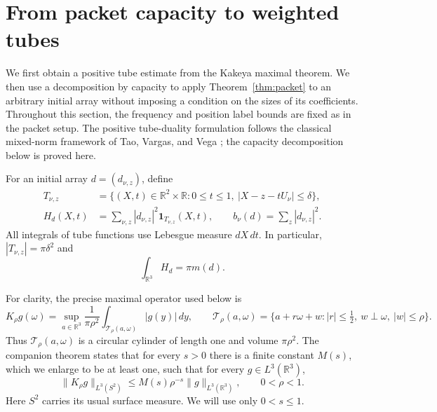 \section{From packet capacity to weighted tubes}\label{sec:density}

We first obtain a positive tube estimate from the Kakeya maximal theorem.
We then use a decomposition by capacity to apply Theorem~\ref{thm:packet}
to an arbitrary initial array without imposing a condition on the sizes
of its coefficients. Throughout this section, the frequency and position
label bounds are fixed as in the packet setup. The positive
tube-duality formulation follows the classical mixed-norm framework
of Tao, Vargas, and Vega \cite[arXiv version~1, Section~3, Equation~(21)]{TaoVargasVega1998};
the capacity decomposition below is proved here.

For an initial array \(d=(d_{\nu,z})\), define
\begin{equation}\label{eq:tube-function}
\begin{split}
 T_{\nu,z}
   &=\{(X,t)\in\mathbb R^2\times\mathbb R:
                   0\le t\le1,\ |X-z-tU_\nu|\le\delta\},\\
 H_d(X,t)&=\sum_{\nu,z}|d_{\nu,z}|^2\mathbf1_{T_{\nu,z}}(X,t),
 \qquad b_\nu(d)=\sum_z|d_{\nu,z}|^2.
\end{split}
\end{equation}
All integrals of tube functions use Lebesgue measure \(dX\,dt\).
In particular, \(|T_{\nu,z}|=\pi\delta^2\) and
\begin{equation}\label{eq:tube-mass}
 \int_{\mathbb R^3}H_d=\pi m(d).
\end{equation}

For clarity, the precise maximal operator used below is
\[
 K_\rho g(\omega)=\sup_{a\in\mathbb R^3}
       \frac{1}{\pi\rho^2}\int_{\mathcal T_\rho(a,\omega)}|g(y)|\,dy,
 \qquad
 \mathcal T_\rho(a,\omega)
 =\{a+r\omega+w: |r|\le\tfrac12,\ w\perp\omega,\ |w|\le\rho\}.
\]
Thus \(\mathcal T_\rho(a,\omega)\) is a circular cylinder of length one
and volume \(\pi\rho^2\). The companion theorem
\cite[Theorem~1.1]{OpenAIKakeya2026} states that for every \(s>0\) there is a finite
constant \(M(s)\), which we enlarge to be at least one, such that
for every \(g\in L^3(\mathbb R^3)\),
\begin{equation}\label{eq:kakeya-input}
 \|K_\rho g\|_{L^3(S^2)}
 \le M(s)\rho^{-s}\|g\|_{L^3(\mathbb R^3)},
 \qquad 0<\rho<1.
\end{equation}
Here \(S^2\) carries its usual surface measure. We will use only
\(0<s\le1\).

